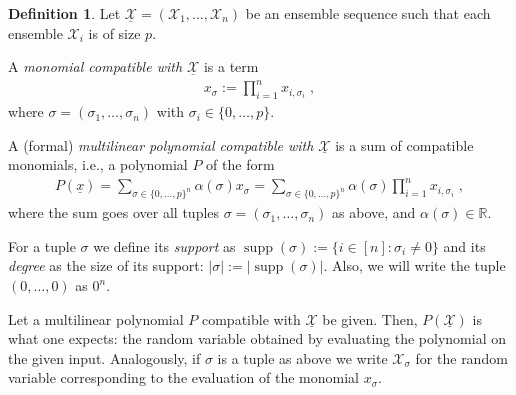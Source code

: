 \documentclass{daj}
\newcommand{\1}{\mathbbm{1}}
\theoremstyle{plain}
\theoremstyle{definition}
\newtheorem{definition}[theorem]{Definition}
\DeclareMathOperator*{\supp}{supp}
\begin{document}
\begin{definition}
Let $\underline{\mathcal{X}} = (\mathcal{X}_1, \ldots, \mathcal{X}_n)$
be an ensemble sequence such that each ensemble $\mathcal{X}_i$ is of size $p$.

A \emph{monomial compatible with $\underline{\mathcal{X}}$} is a term
\begin{align*}
  x_\sigma := \prod_{i=1}^n x_{i,\sigma_i} \; ,
\end{align*}
where $\sigma = (\sigma_1, \ldots, \sigma_n)$ with 
$\sigma_i \in \{0, \ldots, p\}$.

A (formal) \emph{multilinear polynomial
compatible with $\underline{\mathcal{X}}$} is
a sum of compatible monomials, i.e., a polynomial $P$ of the form
\begin{align*}
P(\underline{x}) =
	\sum_{\sigma \in \{0,\ldots,p\}^n} \alpha(\sigma) x_{\sigma} =
	\sum_{\sigma \in \{0,\ldots,p\}^n}
		\alpha(\sigma) \prod_{i=1}^n x_{i, \sigma_i} \; ,
\end{align*}
where the sum goes over all tuples $\sigma = (\sigma_1,\ldots,\sigma_n)$ 
as above, and  $\alpha(\sigma) \in \mathbb{R}$.

For a tuple $\sigma$ we define its \emph{support}
as $\supp(\sigma) := \{ i \in [n]: \sigma_i \ne 0 \}$
and its
 \emph{degree} as the size of its support:
$|\sigma| := |\supp(\sigma)|$.
Also, we will write the tuple $(0, \ldots, 0)$ as $0^n$.
\end{definition}

Let a multilinear polynomial $P$ compatible with $\underline{\mathcal{X}}$
be given. Then, $P(\underline{\mathcal{X}})$ is what one expects:
the random variable obtained by evaluating the polynomial on the given input.
Analogously, if $\sigma$ is a tuple as above we write $\mathcal{X}_\sigma$ for 
the random variable corresponding to the evaluation of the monomial $x_{\sigma}$.
\end{document}
